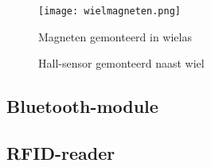 \begin{figure}[H]
	\centering
	\begin{minipage}[b]{0.4\textwidth}
		\centering
		\texttt{[image: wielmagneten.png]}
		\caption{Magneten gemonteerd in wielas\label{fig:wielmagneten}}
	\end{minipage}
	\hfill
	\begin{minipage}[b]{0.4\textwidth}
		\centering
		\caption{Hall-sensor gemonteerd naast wiel\label{fig:hallsensor}}
	\end{minipage}
\end{figure}
\subsection{Bluetooth-module}
\subsection{RFID-reader}
